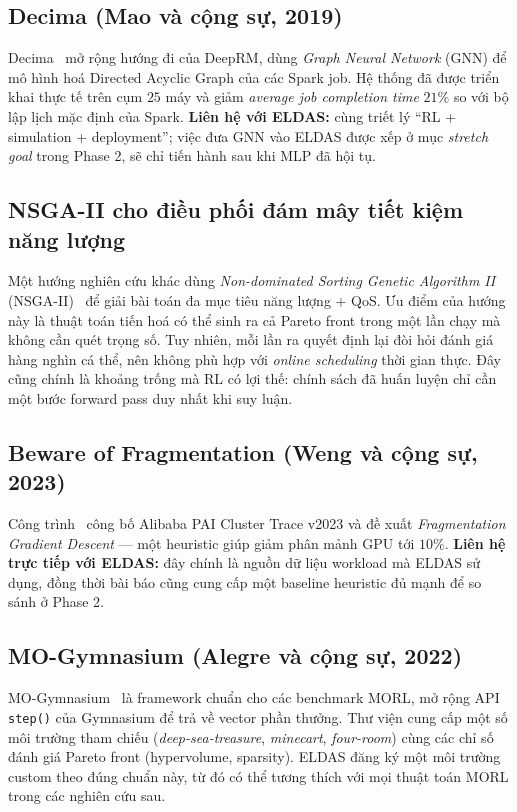 \subsection{Decima (Mao và cộng sự, 2019)}
Decima~\cite{decima2019} mở rộng hướng đi của DeepRM, dùng \textit{Graph
Neural Network} (GNN) để mô hình hoá Directed Acyclic Graph của các
Spark job. Hệ thống đã được triển khai thực tế trên cụm $25$ máy và
giảm \textit{average job completion time} $21\%$ so với bộ lập lịch
mặc định của Spark. \textbf{Liên hệ với ELDAS:} cùng triết lý ``RL +
simulation + deployment''; việc đưa GNN vào ELDAS được xếp ở mục
\textit{stretch goal} trong Phase 2, sẽ chỉ tiến hành sau khi MLP đã
hội tụ.

\subsection{NSGA-II cho điều phối đám mây tiết kiệm năng lượng}
Một hướng nghiên cứu khác dùng \textit{Non-dominated Sorting Genetic
Algorithm II} (NSGA-II)~\cite{deb2002fast} để giải bài toán đa mục tiêu
năng lượng + QoS. Ưu điểm của hướng này là thuật toán tiến hoá có thể
sinh ra cả Pareto front trong một lần chạy mà không cần quét trọng
số. Tuy nhiên, mỗi lần ra quyết định lại đòi hỏi đánh giá hàng nghìn
cá thể, nên không phù hợp với \textit{online scheduling} thời gian
thực. Đây cũng chính là khoảng trống mà RL có lợi thế: chính sách đã
huấn luyện chỉ cần một bước forward pass duy nhất khi suy luận.

\subsection{Beware of Fragmentation (Weng và cộng sự, 2023)}
Công trình~\cite{weng2023alibaba} công bố Alibaba PAI Cluster Trace
v2023 và đề xuất \textit{Fragmentation Gradient Descent} --- một
heuristic giúp giảm phân mảnh GPU tới $10\%$. \textbf{Liên hệ trực
tiếp với ELDAS:} đây chính là nguồn dữ liệu workload mà ELDAS sử dụng,
đồng thời bài báo cũng cung cấp một baseline heuristic đủ mạnh để so
sánh ở Phase 2.

\subsection{MO-Gymnasium (Alegre và cộng sự, 2022)}
MO-Gymnasium~\cite{alegre2022mogym} là framework chuẩn cho các
benchmark MORL, mở rộng API \texttt{step()} của Gymnasium để trả về
vector phần thưởng. Thư viện cung cấp một số môi trường tham chiếu
(\textit{deep-sea-treasure}, \textit{minecart}, \textit{four-room})
cùng các chỉ số đánh giá Pareto front (hypervolume, sparsity). ELDAS
đăng ký một môi trường custom theo đúng chuẩn này, từ đó có thể
tương thích với mọi thuật toán MORL trong các nghiên cứu sau.

